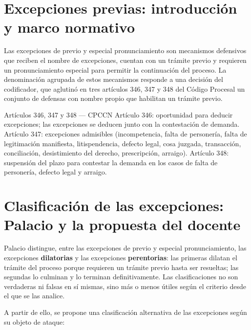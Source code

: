 \documentclass[12pt,oneside]{book}
\begin{document}
\section{Excepciones previas: introducción y marco normativo}

Las excepciones de previo y especial pronunciamiento son mecanismos defensivos que reciben el nombre de excepciones, cuentan con un trámite previo y requieren un pronunciamiento especial para permitir la continuación del proceso. La denominación agrupada de estos mecanismos responde a una decisión del codificador, que aglutinó en tres artículos \textemdash{}346, 347 y 348 del Código Procesal\textemdash{} un conjunto de defensas con nombre propio que habilitan un trámite previo.

\begin{definition}{Artículos 346, 347 y 348 --- CPCCN}
Artículo 346: oportunidad para deducir excepciones; las excepciones se deducen junto con la contestación de demanda. Artículo 347: excepciones admisibles (incompetencia, falta de personería, falta de legitimación manifiesta, litispendencia, defecto legal, cosa juzgada, transacción, conciliación, desistimiento del derecho, prescripción, arraigo). Artículo 348: suspensión del plazo para contestar la demanda en los casos de falta de personería, defecto legal y arraigo.
\end{definition}

\section{Clasificación de las excepciones: Palacio y la propuesta del docente}

Palacio distingue, entre las excepciones de previo y especial pronunciamiento, las excepciones \textbf{dilatorias} y las excepciones \textbf{perentorias}: las primeras dilatan el trámite del proceso porque requieren un trámite previo hasta ser resueltas; las segundas lo culminan y lo terminan definitivamente. Las clasificaciones no son verdaderas ni falsas en sí mismas, sino más o menos útiles según el criterio desde el que se las analice.

A partir de ello, se propone una clasificación alternativa de las excepciones según su objeto de ataque:
\end{document}
